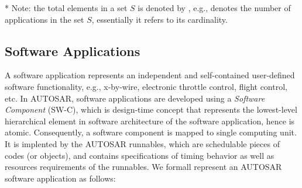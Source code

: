 {\footnotesize 
	* Note: the total elements in a set $S$ is denoted by , e.g.,  denotes the number of applications in the set $S$, essentially it refers to its cardinality.}

\subsection{Software Applications}
A software application represents an independent and self-contained user-defined software functionality, e.g., x-by-wire, electronic throttle control, flight control, etc. In AUTOSAR, software applications are developed using a \textit{Software Component} (SW-C), which is design-time concept that represents the lowest-level hierarchical element in software architecture of the software application, hence is atomic. Consequently, a software component is mapped to single computing unit. It is implented by the AUTOSAR runnables, which are schedulable pieces of codes (or objects), and contains specifications of timing behavior as well as resources requirements of the runnables. We formall represent an AUTOSAR software application as follows:

